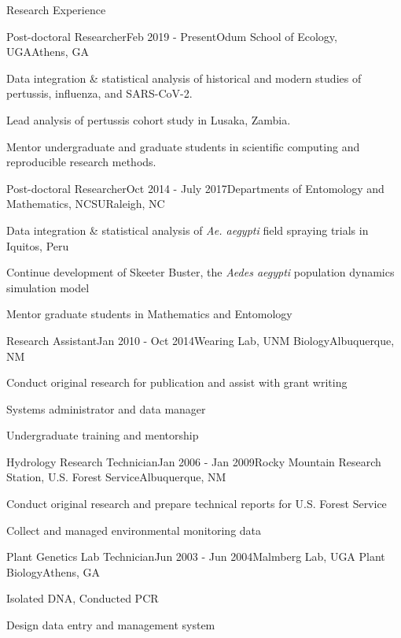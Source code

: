 \documentclass{resume} %
\begin{document}
\begin{rSection}{Research Experience}

\begin{rSubsection}{Post-doctoral Researcher}{Feb 2019 - Present}{Odum School of
Ecology, UGA}{Athens, GA}
\item Data integration \& statistical analysis of historical and modern studies of pertussis, influenza, and SARS-CoV-2.
\item Lead analysis of pertussis cohort study in Lusaka, Zambia.
\item Mentor undergraduate and graduate students in scientific computing and reproducible research methods.
\end{rSubsection}

\begin{rSubsection}{Post-doctoral Researcher}{Oct 2014 - July 2017}{Departments of
Entomology and Mathematics, NCSU}{Raleigh, NC}
\item Data integration \& statistical analysis of {\em Ae. aegypti} field spraying trials in Iquitos, Peru
\item Continue development of Skeeter Buster, the {\em Aedes aegypti} population dynamics simulation model
\item Mentor graduate students in Mathematics and Entomology
\end{rSubsection}

\begin{rSubsection}{Research Assistant}{Jan 2010 - Oct 2014}{Wearing Lab, UNM Biology}{Albuquerque, NM}
\item Conduct original research for publication and assist with grant writing
\item Systems administrator and data manager
\item Undergraduate training and mentorship
\end{rSubsection}

\begin{rSubsection}{Hydrology Research Technician}{Jan 2006 - Jan 2009}{Rocky
Mountain Research Station, U.S. Forest Service}{Albuquerque, NM}
\item Conduct original research and prepare technical reports for U.S. Forest Service
\item Collect and managed environmental monitoring data 
\end{rSubsection}

\begin{rSubsection}{Plant Genetics Lab Technician}{Jun 2003 - Jun 2004}{Malmberg Lab, UGA Plant Biology}{Athens, GA}
\item Isolated DNA, Conducted PCR
\item Design data entry and management system
\end{rSubsection}


\end{rSection}
\end{document}
